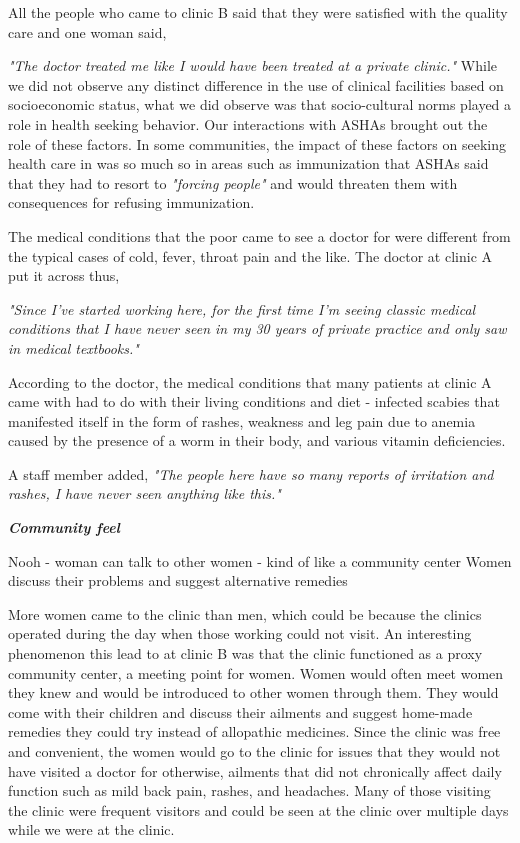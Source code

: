 All the people who came to clinic B said that they were satisfied with the quality care and one woman said,

\textit{"The doctor treated me like I would have been treated at a private clinic."}
While we did not observe any distinct difference in the use of clinical facilities based on socioeconomic status, what we did observe was that socio-cultural norms played a role in health seeking behavior. Our interactions with ASHAs brought out the role of these factors. In some communities, the impact of these factors on seeking health care in was so much so in areas such as immunization that ASHAs said that they had to resort to \textit{"forcing people"} and would threaten them with consequences for refusing immunization.

The medical conditions that the poor came to see a doctor for were different from the typical cases of cold, fever, throat pain and the like. The doctor at clinic A put it across thus,

\textit{"Since I've started working here, for the first time I'm seeing classic medical conditions that I have never seen in my 30 years of private practice and only saw in medical textbooks."}

According to the doctor, the medical conditions that many patients at clinic A came with had to do with their living conditions and diet - infected scabies that manifested itself in the form of rashes, weakness and leg pain due to anemia caused by the presence of a worm in their body, and various vitamin deficiencies.

A staff member added,
\textit{"The people here have so many reports of irritation and rashes, I have never seen anything like this."}

\textbf{\textit{Community feel}}

Nooh - woman can talk to other women - kind of like a community center
Women discuss their problems and suggest alternative remedies

More women came to the clinic than men, which could be because the clinics operated during the day when those working could not visit. An interesting phenomenon this lead to at clinic B was that the clinic functioned as a proxy community center, a meeting point for women. Women would often meet women they knew and would be introduced to other women through them. They would come with their children and discuss their ailments and suggest home-made remedies they could try instead of allopathic medicines. Since the clinic was free and convenient, the women would go to the clinic for issues that they would not have visited a doctor for otherwise, ailments that did not chronically affect daily function such as mild back pain, rashes, and headaches. Many of those visiting the clinic were frequent visitors and could be seen at the clinic over multiple days while we were at the clinic.

